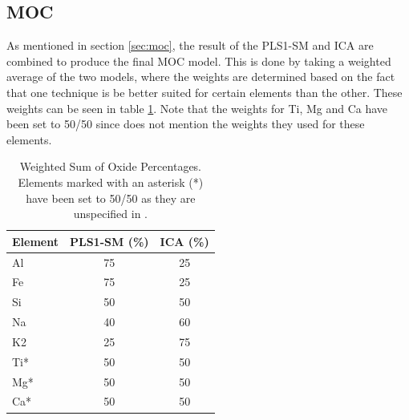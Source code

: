 \subsection{MOC}
As mentioned in section \ref{sec:moc}, the result of the PLS1-SM and ICA are combined to produce the final MOC model.
This is done by taking a weighted average of the two models, where the weights are determined based on the fact that one technique is be better suited for certain elements than the other.
These weights can be seen in table \ref{tab:weighted_sum_oxide}.
Note that the weights for Ti, Mg and Ca have been set to 50/50 since \citeauthor{cleggRecalibrationMarsScience2017} does not mention the weights they used for these elements.

\begin{table}[h]
\centering
\begin{tabular*}{\columnwidth}{@{\extracolsep{\fill}}lcc}
\toprule
Element  & PLS1-SM (\%) & ICA (\%) \\ \midrule
Al       & 75           & 25      \\
Fe       & 75           & 25      \\
Si       & 50           & 50      \\
Na       & 40           & 60      \\
K2       & 25           & 75      \\
Ti*      & 50           & 50      \\
Mg*      & 50           & 50      \\
Ca*      & 50           & 50      \\
\bottomrule
\end{tabular*}
\caption{Weighted Sum of Oxide Percentages. Elements marked with an asterisk (*) have been set to 50/50 as they are unspecified in \citeauthor{cleggRecalibrationMarsScience2017}.}
\label{tab:weighted_sum_oxide}
\end{table}






